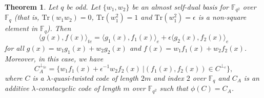 \documentclass[12 pt]{extarticle}
\numberwithin{equation}{section}
\newtheorem{theorem}{Theorem}[section]
\theoremstyle{definition}
\begin{document}
\begin{theorem} \label{oddte}
 Let $q$ be odd. Let $\{w_1,w_2\}$ be an almost self-dual basis for $\mathbb{F}_{q^2}$ over $\mathbb{F}_q$ 
 (that is,  $\text{Tr}(w_1w_2)=0$, $\text{Tr}(w_1^2)=1$ and  $\text{Tr}(w_1^2)=\epsilon$ is a non-square element in $\mathbb{F}_q$). 
 Then
 $$\langle g(x), f(x)\rangle_{te}=\langle g_1(x),f_1(x)\rangle_e+\epsilon \langle g_2(x),f_2(x)\rangle_e$$
 for all $g(x)=w_1g_1(x)+w_2g_2(x)$ and $f(x)=w_1f_1(x)+w_2f_2(x)$. 
 Moreover, in this case, we have  $$C_A^{\perp_{te}}=\{w_1f_1(x)+\epsilon^{-1}w_2f_2(x)\ | (f_1(x),f_2(x))\in C^{\perp_e}\},$$
where $C$ is a $\lambda$-quasi-twisted code of length $2m$ and index $2$ over $\mathbb{F}_q$ and $C_A$ is an additive $\lambda$-constacyclic code of length $m$ over $\mathbb{F}_{q^2}$ such that  $\phi(C)=C_A$.
\end{theorem}
\end{document}
